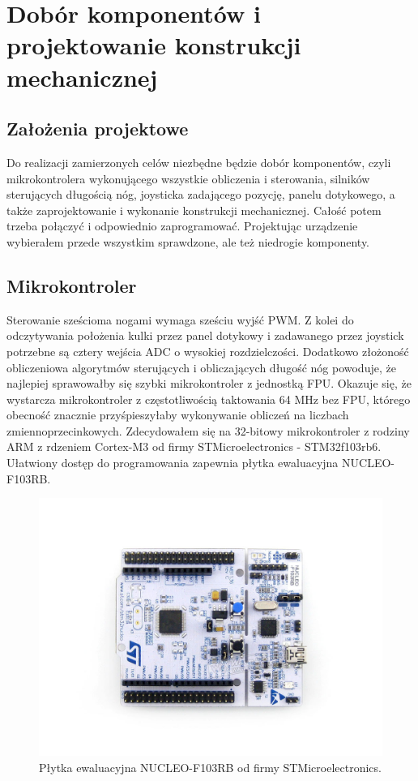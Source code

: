 \newpage %
\section{Dobór komponentów i projektowanie konstrukcji mechanicznej}


\subsection{Założenia projektowe}
Do realizacji zamierzonych celów niezbędne będzie dobór komponentów, czyli mikrokontrolera wykonującego wszystkie obliczenia i sterowania, silników sterujących długością nóg, joysticka zadającego pozycję, panelu dotykowego, a także zaprojektowanie i wykonanie konstrukcji mechanicznej. 
Całość potem trzeba połączyć i odpowiednio zaprogramować. Projektując urządzenie wybierałem przede wszystkim sprawdzone, ale też niedrogie komponenty. 

\subsection{Mikrokontroler}
Sterowanie sześcioma nogami wymaga sześciu wyjść PWM. 
Z kolei do odczytywania położenia kulki przez panel dotykowy i zadawanego przez joystick potrzebne są cztery wejścia ADC o wysokiej rozdzielczości. 
Dodatkowo złożoność obliczeniowa algorytmów sterujących i obliczających długość nóg powoduje, że najlepiej sprawowałby się szybki mikrokontroler z jednostką FPU. 
Okazuje się, że wystarcza mikrokontroler z częstotliwością taktowania 64 MHz bez FPU, którego obecność znacznie przyśpieszyłaby wykonywanie obliczeń na liczbach zmiennoprzecinkowych.
Zdecydowałem się na 32-bitowy mikrokontroler z rodziny ARM z rdzeniem Cortex-M3 od firmy STMicroelectronics - STM32f103rb6. Ułatwiony dostęp do programowania zapewnia płytka ewaluacyjna NUCLEO-F103RB.


\begin{figure}[!h]
    \label{fig:anzelm}
    \centering
    \includegraphics[width=0.5\linewidth]{img/NUCLEO-F103RB-5.jpg}
    \caption{Płytka ewaluacyjna NUCLEO-F103RB od firmy STMicroelectronics.}
\end{figure}


